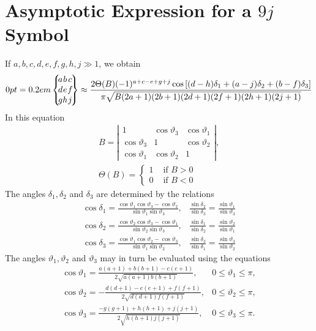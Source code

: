 \section{Asymptotic Expression for a $9 j$ Symbol}\label{sec:10.7}
If $a, b, c, d, e, f, g, h, j \gg 1$, we obtain
\begin{equation}
\ninej{a}{b}{c}{d}{e}{f}{g}{h}{j} \label{eq:10:7:1} \approx \frac{2 \Theta(B)(-1)^{a+c-e+g+j} \cos \left[(d-h) \delta_{1}+(a-j) \delta_{2}+(b-f) \delta_{3}\right]}{\pi \sqrt{B(2 a+1)(2 b+1)(2 d+1)(2 f+1)(2 h+1)(2 j+1)}}
\end{equation}
In this equation
\begin{gather}
B=\left|\begin{array}{ccc}
1 & \cos \vartheta_{3} & \cos \vartheta_{1} \\
\cos \vartheta_{3} & 1 & \cos \vartheta_{2} \\
\cos \vartheta_{1} & \cos \vartheta_{2} & 1
\end{array}\right|,  \label{eq:10:7:2}\\
\Theta(B)=\left\{\begin{array}{cc}
1 & \text { if } B>0 \\
0 & \text { if } B<0
\end{array}\right. \label{eq:10:7:3}
\end{gather}
The angles $\delta_{1}, \delta_{2}$ and $\delta_{3}$ are determined by the relations
\begin{equation}
\begin{array}{ll}
\cos \delta_{1}=\frac{\cos \vartheta_{1} \cos \vartheta_{3}-\cos \vartheta_{2}}{\sin \vartheta_{1} \sin \vartheta_{3}}, & \frac{\sin \delta_{2}}{\sin \delta_{3}}=\frac{\sin \vartheta_{1}}{\sin \vartheta_{3}} \\
\cos \delta_{2}=\frac{\cos \vartheta_{2} \cos \vartheta_{3}-\cos \vartheta_{1}}{\sin \vartheta_{2} \sin \vartheta_{3}}, & \frac{\sin \delta_{1}}{\sin \delta_{2}}=\frac{\sin \vartheta_{2}}{\sin \vartheta_{1}}  \label{eq:10:7:4}\\
\cos \delta_{3}=\frac{\cos \vartheta_{1} \cos \vartheta_{2}-\cos \vartheta_{3}}{\sin \vartheta_{1} \sin \vartheta_{2}}, & \frac{\sin \delta_{3}}{\sin \delta_{1}}=\frac{\sin \vartheta_{3}}{\sin \vartheta_{2}}
\end{array}
\end{equation}
The angles $\vartheta_{1}, \vartheta_{2}$ and $\vartheta_{3}$ may in turn be evaluated using the equations
\begin{equation}
\begin{array}{ll}
\cos \vartheta_{1}=\frac{a(a+1)+b(b+1)-c(c+1)}{2 \sqrt{a(a+1) b(b+1)}}, & 0 \leq \vartheta_{1} \leq \pi, \\
\cos \vartheta_{2}=-\frac{d(d+1)-e(e+1)+f(f+1)}{2 \sqrt{d(d+1) f(f+1)}}, & 0 \leq \vartheta_{2} \leq \pi,  \label{eq:10:7:5}\\
\cos \vartheta_{3}=\frac{-g(g+1)+h(h+1)+j(j+1)}{2 \sqrt{h(h+1) j(j+1)}}, & 0 \leq \vartheta_{3} \leq \pi .
\end{array}
\end{equation}
